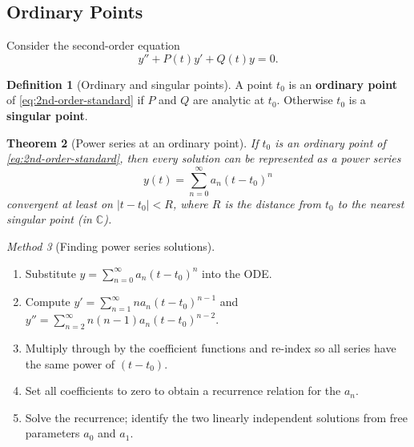 \documentclass[12pt,a4paper,openany]{book}
\theoremstyle{definition}
\newtheorem{definition}{Definition}[chapter]
\theoremstyle{plain}
\newtheorem{theorem}[definition]{Theorem}
\theoremstyle{remark}
\newtheorem{method}[definition]{Method}
\newcommand{\C}{\mathbb{C}}
\newcommand{\abs}[1]{\left|#1\right|}
\begin{document}
\subsection{Ordinary Points}\label{subsec:ordinary-points}

Consider the second-order equation
\begin{equation}\label{eq:2nd-order-standard}
  y'' + P(t)y' + Q(t)y = 0.
\end{equation}

\begin{definition}[Ordinary and singular points]\label{def:ordinary-singular}
A point $t_0$ is an \textbf{ordinary point} of \eqref{eq:2nd-order-standard}
if $P$ and $Q$ are analytic at $t_0$.  Otherwise $t_0$ is a
\textbf{singular point}.
\end{definition}

\begin{theorem}[Power series at an ordinary point]\label{thm:power-series-ordinary}
If $t_0$ is an ordinary point of \eqref{eq:2nd-order-standard}, then every
solution can be represented as a power series
\begin{equation}\label{eq:ps-solution}
  y(t) = \sum_{n=0}^{\infty}a_n(t-t_0)^n
\end{equation}
convergent at least on $\abs{t-t_0}<R$, where $R$ is the distance from
$t_0$ to the nearest singular point (in $\C$).
\end{theorem}

\begin{method}[Finding power series solutions]\label{meth:power-series}
\begin{enumerate}[label=\textbf{Step \arabic*:}]
  \item Substitute $y=\sum_{n=0}^{\infty}a_n(t-t_0)^n$ into the ODE.
  \item Compute $y'=\sum_{n=1}^{\infty}na_n(t-t_0)^{n-1}$ and
    $y''=\sum_{n=2}^{\infty}n(n-1)a_n(t-t_0)^{n-2}$.
  \item Multiply through by the coefficient functions and re-index so all
    series have the same power of $(t-t_0)$.
  \item Set all coefficients to zero to obtain a recurrence relation for
    the $a_n$.
  \item Solve the recurrence; identify the two linearly independent
    solutions from free parameters $a_0$ and $a_1$.
\end{enumerate}
\end{method}
\end{document}
